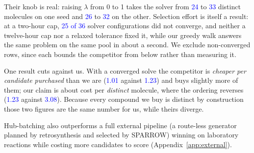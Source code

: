 \documentclass{article}
\newcommand{\checkval}[1]{\textcolor{blue}{#1}}
\begin{document}
Their knob is real: raising $\lambda$ from 0 to 1 takes the solver from \checkval{24} to \checkval{33} distinct molecules on one seed and \checkval{26} to \checkval{32} on the other. Selection effort is itself a result:
at a two-hour cap, \checkval{25 of 36} solver configurations did not converge, and neither a twelve-hour cap nor a relaxed tolerance fixed it, while our greedy walk answers the same problem on the same pool in about a second. We exclude non-converged rows, since each bounds the competitor from below rather than measuring it.

One result cuts against us. With a converged solve the competitor is \emph{cheaper per candidate purchased} than we are (\checkval{1.01} against \checkval{1.23}) and buys slightly more of them; our claim is about cost per \emph{distinct} molecule, where the ordering reverses (\checkval{1.23} against \checkval{3.08}). Because every compound we buy is distinct by construction those two figures are the same number for us, while theirs diverge.

Hub-batching also outperforms a full external pipeline (a route-less generator
\citep{kim2026s3gfn} planned by retrosynthesis and selected by SPARROW) winning
on laboratory reactions while costing more candidates to score
(Appendix~\ref{app:external}).



\end{document}
